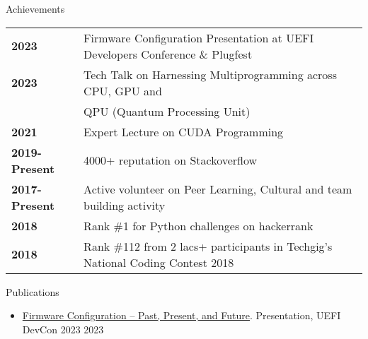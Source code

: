 \documentclass{resume} %
\begin{document}
\begin{rSection}{Achievements}

\begin{tabular}{ @{} >{\bfseries}l @{\hspace{6ex}} l }
2023 & Firmware Configuration Presentation at UEFI Developers Conference \& Plugfest \\
2023 & Tech Talk on Harnessing Multiprogramming across CPU, GPU and 
\\ & QPU (Quantum Processing Unit) \\
2021 & Expert Lecture on CUDA Programming \\
2019-Present & 4000+ reputation on Stackoverflow \\
2017-Present & Active volunteer on Peer Learning, Cultural and team building activity \\
2018 & Rank \#1 for Python challenges on hackerrank \\
2018 & Rank \#112 from 2 lacs+ participants in Techgig's National Coding Contest 2018 \\

\end{tabular}

\end{rSection}

\begin{rSection}{Publications}

\begin{itemize}
    \item \href{https://uefi.org/sites/default/files/resources/Firmware%20Configuration%20%E2%80%93%20Past%2C%20Present%2C%20and%20Future_Zimmer.pdf}{Firmware Configuration – Past, Present, and Future}. Presentation, UEFI DevCon 2023 \hfill {2023}
\end{itemize}


\end{rSection}
\end{document}
